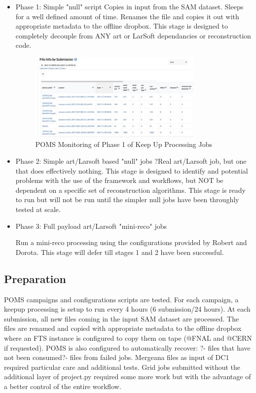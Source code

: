 \documentclass[pdftex,12pt,letter]{article}
\begin{document}
\begin {itemize}

\item Phase 1: Simple "null" script
 Copies in input from the SAM dataset.  Sleeps for a well defined amount of time.  Renames the file and copies it out with appropriate metadata to the offline dropbox.
This stage is designed to completely decouple from ANY art or LarSoft dependancies or reconstruction code. 



\begin{figure}[tbh]
  \centering
  \includegraphics[width=0.8\textwidth]{./ReportImages/Phase1keepup.jpg}
  \caption{POMS Monitoring of Phase 1 of Keep Up Processing Jobs}
  \label{fig:keepupprocessingphase1}
\end{figure}


\item Phase 2: Simple art/Larsoft based "null" jobs
 ?Real art/Larsoft job, but one that does effectively nothing.  This stage is designed to identify and potential problems with the use of the framework and workflows, but NOT be dependent on a specific set of reconstruction algorithms.  
 This stage is ready to run but will not be run until the simpler null jobs have been throughly tested at scale.


\item Phase 3: Full payload art/Larsoft "mini-reco" jobs

 Run  a mini-reco processing using the configurations provided by Robert and Dorota. This stage will defer till stages 1 and 2 have been successful.

\end{itemize}

\subsection {Preparation}

POMS campaigns and configurations scripts are tested.
For each campaign, a keepup processing is setup to run every 4 hours (6 submission/24 hours).
At each submission, all new files coming in the input SAM dataset are processed.
The files are renamed and copied with appropriate metadata to the offline dropbox where an FTS instance is configured to copy them on tape (@FNAL and @CERN if requested).
POMS is also configured to automatically  recover:  ?- files that have not been consumed?- files from failed jobs.
Mergeana files as input of DC1 required particular care and additional tests.
Grid jobs submitted  without the additional layer of project.py required some more work but with the advantage of a better control of the entire workflow.
\end{document}
